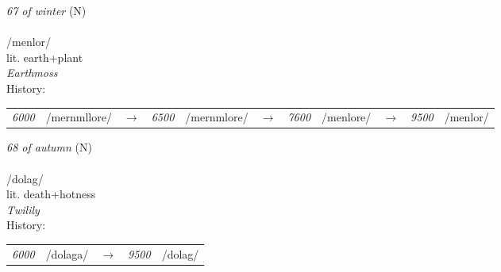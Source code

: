 \vspace{15pt}
\begin{nopagebreak}
 \textit{67 of winter} (N)\\
\\
\noindent /m{\textprimstress}enlor/\\
\noindent lit. earth+plant\\
\noindent \textit{Earthmoss}\\


\noindent History:

\vspace{-0pt}
\hspace{40pt}
\begin{tabular}{ccc}
\textit{6000} & /mernmllore/&$\rightarrow$ & \textit{6500} & /mernmlore/&$\rightarrow$ & \textit{7600} & /menlore/&$\rightarrow$ & \textit{9500} & /menlor/& \\
\end{tabular}

\vspace{20pt}\hline

\end{nopagebreak}
\filbreak



\vspace{15pt}
\begin{nopagebreak}
 \textit{68 of autumn} (N)\\
\\
\noindent /d{\textprimstress}olag/\\
\noindent lit. death+hotness\\
\noindent \textit{Twilily}\\


\noindent History:

\vspace{-0pt}
\hspace{40pt}
\begin{tabular}{ccc}
\textit{6000} & /dolaga/&$\rightarrow$ & \textit{9500} & /dolag/& \\
\end{tabular}

\vspace{20pt}\hline

\end{nopagebreak}
\filbreak



